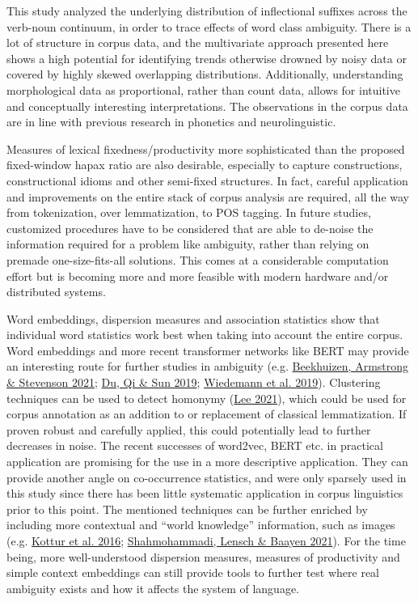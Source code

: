 \documentclass[
]{article}
\begin{document}
This study analyzed the underlying distribution of inflectional suffixes
across the verb-noun continuum, in order to trace effects of word class
ambiguity. There is a lot of structure in corpus data, and the
multivariate approach presented here shows a high potential for
identifying trends otherwise drowned by noisy data or covered by highly
skewed overlapping distributions. Additionally, understanding
morphological data as proportional, rather than count data, allows for
intuitive and conceptually interesting interpretations. The observations
in the corpus data are in line with previous research in phonetics and
neurolinguistic.

Measures of lexical fixedness/productivity more sophisticated than the
proposed fixed-window hapax ratio are also desirable, especially to
capture constructions, constructional idioms and other semi-fixed
structures. In fact, careful application and improvements on the entire
stack of corpus analysis are required, all the way from tokenization,
over lemmatization, to POS tagging. In future studies, customized
procedures have to be considered that are able to de-noise the
information required for a problem like ambiguity, rather than relying
on premade one-size-fits-all solutions. This comes at a considerable
computation effort but is becoming more and more feasible with modern
hardware and/or distributed systems.

Word embeddings, dispersion measures and association statistics show
that individual word statistics work best when taking into account the
entire corpus. Word embeddings and more recent transformer networks like
BERT may provide an interesting route for further studies in ambiguity
(e.g. \protect\hyperlink{ref-beekhuizen_et_al21}{Beekhuizen, Armstrong
\& Stevenson 2021}; \protect\hyperlink{ref-du_et_al19}{Du, Qi \& Sun
2019}; \protect\hyperlink{ref-wiedemann19}{Wiedemann et al. 2019}).
Clustering techniques can be used to detect homonymy
(\protect\hyperlink{ref-lee21}{Lee 2021}), which could be used for
corpus annotation as an addition to or replacement of classical
lemmatization. If proven robust and carefully applied, this could
potentially lead to further decreases in noise. The recent successes of
word2vec, BERT etc. in practical application are promising for the use
in a more descriptive application. They can provide another angle on
co-occurrence statistics, and were only sparsely used in this study
since there has been little systematic application in corpus linguistics
prior to this point. The mentioned techniques can be further enriched by
including more contextual and ``world knowledge'' information, such as
images (e.g. \protect\hyperlink{ref-kottur16}{Kottur et al. 2016};
\protect\hyperlink{ref-shahmohammadi21}{Shahmohammadi, Lensch \& Baayen
2021}). For the time being, more well-understood dispersion measures,
measures of productivity and simple context embeddings can still provide
tools to further test where real ambiguity exists and how it affects the
system of language.
\end{document}
